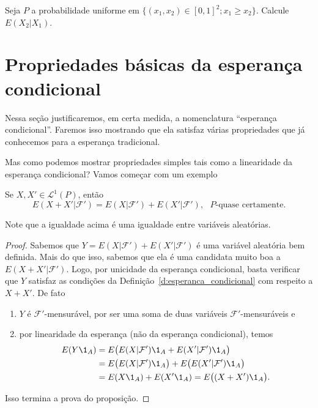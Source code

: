 \begin{exercise}
  Seja $P$ a probabilidade uniforme em $\{(x_1, x_2) \in [0,1]^2; x_1 \geq x_2\}$.
  Calcule $E(X_2|X_1)$.
\end{exercise}

\section{Propriedades básicas da esperança condicional}

Nessa seção justificaremos, em certa medida, a nomenclatura ``esperança condicional''.
Faremos isso mostrando que ela satisfaz várias propriedades que já conhecemos para a esperança tradicional.

Mas como podemos mostrar propriedades simples tais como a linearidade da esperança condicional?
Vamos começar com um exemplo

\begin{proposition}
  Se $X, X' \in \mathcal{L}^1(P)$, então
  \begin{equation}
    E(X + X'|\mathcal{F}') = E(X|\mathcal{F}') + E(X'|\mathcal{F}'), \text{ $P$-quase certamente.}
  \end{equation}
\end{proposition}

Note que a igualdade acima é uma igualdade entre variáveis aleatórias.

\begin{proof}
  Sabemos que $Y = E(X|\mathcal{F}') + E(X'|\mathcal{F}')$ é uma variável aleatória bem definida.
  Mais do que isso, sabemos que ela é uma candidata muito boa a $E(X + X'|\mathcal{F}')$.
  Logo, por unicidade da esperança condicional, basta verificar que $Y$ satisfaz as condições da Definição~\ref{d:esperanca_condicional} com respeito a $X + X'$.
  De fato
  \begin{enumerate}[\quad a)]
  \item $Y$ é $\mathcal{F}'$-mensurável, por ser uma soma de duas variáveis $\mathcal{F}'$-mensuráveis e
  \item por linearidade da esperança (não da esperança condicional), temos
    \begin{equation}
      \begin{split}
        E(Y \1_A) & = E\big( E(X|\mathcal{F}')\1_A + E(X'|\mathcal{F}')\1_A \big)\\
        & = E\big( E(X|\mathcal{F}')\1_A\big) + E\big(E(X'|\mathcal{F}')\1_A \big)\\
        & = E(X \1_A) + E(X' \1_A) = E\big( (X + X') \1_A \big).
      \end{split}
    \end{equation}
  \end{enumerate}
  Isso termina a prova do proposição.
\end{proof}


